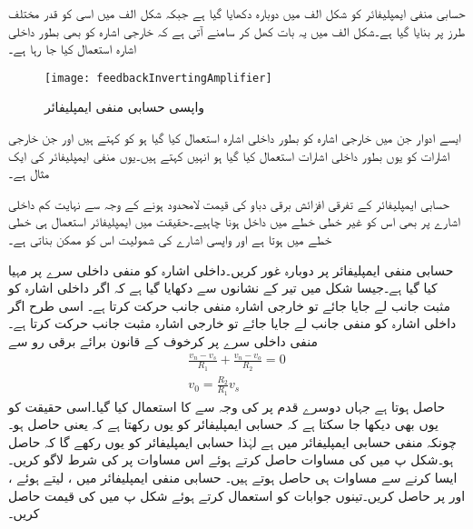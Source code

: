 حسابی منفی ایمپلیفائر کو شکل  الف میں دوبارہ دکھایا گیا ہے جبکہ شکل  الف     میں اسی کو قدر مختلف طرز پر بنایا گیا ہے۔شکل  الف     میں یہ بات کھل کر سامنے آتی ہے کہ خارجی اشارہ  کو بھی بطور داخلی اشارہ استعمال کیا جا رہا ہے۔
\begin{figure}
\centering
\texttt{[image: feedbackInvertingAmplifier]}
\caption{واپسی حسابی منفی ایمپلیفائر}
\label{شکل_حسابی_واپسی_منفی_ایمپلیفائر}
\end{figure}

ایسے ادوار جن میں خارجی اشارہ کو بطور داخلی اشارہ استعمال کیا گیا ہو کو  کہتے ہیں اور جن خارجی  اشارات کو یوں بطور داخلی اشارات استعمال کیا گیا ہو انہیں   کہتے ہیں۔یوں منفی ایمپلیفائر  کی ایک مثال ہے۔

حسابی ایمپلیفائر کے تفرقی افزائش برقی دباو   کی قیمت لامحدود ہونے کے وجہ سے نہایت کم داخلی اشارے پر بھی اس کو غیر خطی خطے میں داخل ہونا چاہیے۔حقیقت میں ایمپلیفائر استعمال ہی خطی خطے میں ہوتا ہے اور واپسی اشارے کی شمولیت اس کو ممکن بناتی ہے۔

حسابی منفی ایمپلیفائر پر دوبارہ غور کریں۔داخلی اشارہ  کو منفی داخلی سرے پر مہیا کیا گیا ہے۔جیسا شکل میں تیر کے نشانوں سے دکھایا گیا ہے کہ اگر داخلی اشارہ  کو مثبت جانب  لے جایا جائے تو خارجی اشارہ  منفی جانب  حرکت کرتا ہے۔ اسی طرح اگر داخلی اشارہ  کو منفی جانب  لے جایا جائے تو خارجی اشارہ  مثبت جانب  حرکت کرتا ہے۔منفی داخلی سرے  پر کرخوف کے قانون برائے برقی رو سے 
\begin{align}\label{مساوات_حسابی_واپسی_منفی}
\frac{v_n-v_s}{R_1}+\frac{v_n-v_o}{R_2}=0\\
v_0=\frac{R_2}{R_1} v_s
\end{align}
حاصل ہوتا ہے جہاں  دوسرے قدم پر  کی وجہ سے  کا استعمال کیا گیا۔اسی حقیقت کو یوں بھی دیکھا جا سکتا ہے کہ حسابی ایمپلیفائر  کو یوں رکھتا ہے کہ  یعنی   حاصل ہو۔چونکہ منفی حسابی ایمپلیفائر میں  ہے لہٰذا حسابی ایمپلیفائر  کو یوں رکھے گا کہ  حاصل ہو۔شکل  پ میں  کی مساوات حاصل کرتے ہوئے  اس مساوات پر  کی شرط لاگو کریں۔ایسا کرنے سے مساوات  ہی حاصل ہوتے ہیں۔
حسابی منفی ایمپلیفائر میں ،  لیتے ہوئے ،   اور   پر  حاصل کریں۔تینوں جوابات کو استعمال کرتے ہوئے شکل  پ میں  کی قیمت حاصل کریں۔

